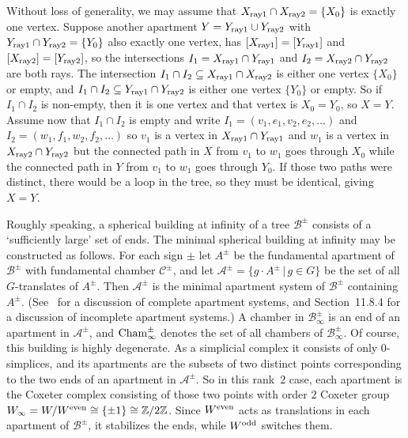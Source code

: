\documentclass[pdftex]{sigma}
\numberwithin{equation}{section}
\def\Z{\mathbb{Z}}
\def\cA{\mathcal A}
\def\cB{\mathcal B}
\def\cC{\mathcal C}
\begin{document}
Without loss of generality, we may assume that $X_{\rm ray1}\cap X_{\rm ray2} = \{X_0\}$ is exactly one vertex.
Suppose another apartment $Y = Y_{\rm ray1}\cup Y_{\rm ray2}$ with $Y_{\rm ray1}\cap Y_{\rm ray2} = \{Y_0\}$ also exactly one vertex, has
$[X_{\rm ray1}] = [Y_{\rm ray1}]$ and $[X_{\rm ray2}] = [Y_{\rm ray2}]$, so the intersections
$I_1 = X_{\rm ray1}\cap Y_{\rm ray1}$ and $I_2 = X_{\rm ray2}\cap Y_{\rm ray2}$ are both rays. The intersection
$I_1\cap I_2\subseteq X_{\rm ray1}\cap X_{\rm ray2}$ is either one vertex $\{X_0\}$ or empty, and
$I_1\cap I_2\subseteq Y_{\rm ray1}\cap Y_{\rm ray2}$ is either one vertex $\{Y_0\}$ or empty. So if $I_1\cap I_2$ is non-empty, then it is one vertex
and that vertex is $X_0 = Y_0$, so $X = Y$. Assume now that $I_1\cap I_2$ is empty and write $I_1 = (v_1,e_1,v_2,e_2,\dots)$ and
$I_2 = (w_1,f_1,w_2,f_2,\dots)$ so $v_1$ is a vertex in $X_{\rm ray1}\cap Y_{\rm ray1}$ and $w_1$ is a vertex in $X_{\rm ray2}\cap Y_{\rm ray2}$ but
the connected path in $X$ from $v_1$ to $w_1$ goes through $X_0$ while the connected path in $Y$ from $v_1$ to $w_1$ goes
through $Y_0$. If those two paths were distinct, there would be a loop in the tree, so they must be identical, giving $X = Y$.


Roughly speaking, a spherical building at infinity of a tree $\cB^\pm$ consists of a `sufficiently large' set of ends. The minimal spherical
building at infinity may be constructed as follows. For each sign $\pm$ let $A^\pm$ be the fundamental apartment of $\cB^\pm$ with
fundamental chamber $\cC^\pm$, and let $\cA^\pm = \big\{g\cdot A^\pm\, |\, g\in G\big\}$ be the set of all $G$-translates of $A^\pm$.
Then $\cA^\pm$ is the minimal apartment system of $\cB^\pm$ containing $A^\pm$.
(See~\cite[Section 4.5]{AbramenkoBrown08} for a discussion of complete apartment systems, and Section~11.8.4 for a discussion of incomplete apartment systems.)
A chamber in $\cB_\infty^\pm$ is an end of
an apartment in $\cA^\pm$, and ${\rm Cham}_\infty^\pm$ denotes the set of all chambers of $\cB_\infty^\pm$.
Of course, this building is highly degenerate. As a simplicial complex it consists of only $0$-simplices, and its apartments are
the subsets of two distinct points corresponding to the two ends of an apartment in $\cA^\pm$.
So in this rank~2 case, each apartment is the Coxeter complex consisting of those two points with order $2$ Coxeter group
$W_{\infty} = W/W^{\rm even} \cong \{\pm 1\} \cong \Z/2\Z$.
Since $W^{\rm even}$ acts as translations in each apartment of $\cB^\pm$, it stabilizes the ends, while $W^{\rm odd}$ switches them.
\end{document}
